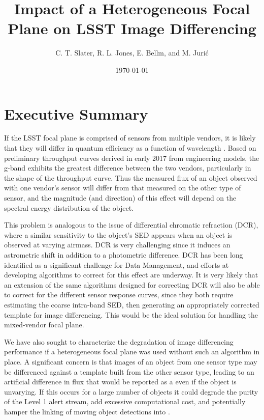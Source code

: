 \documentclass[DM,toc,lsstdraft]{lsstdoc}
\title[Heterogeneous Focal Plane]{Impact of a Heterogeneous Focal Plane on LSST Image Differencing}
\author{C. T. Slater, R. L. Jones, E. Bellm, and M. Juri\'c}
\date{\today}
\begin{document}
\maketitle

\section{Executive Summary}

If the LSST focal plane is comprised of sensors from multiple vendors, it is
likely that they will differ in quantum efficiency as a function of wavelength .
Based on preliminary throughput curves derived in early 2017 from engineering
models, the g-band exhibits the greatest difference between the two vendors,
particularly in the shape of the throughput curve. Thus the measured flux of an
object observed with one vendor's sensor will differ from that measured on the
other type of sensor, and the magnitude (and direction) of this effect will
depend on the spectral energy distribution of the object.

This problem is analogous to the issue of differential chromatic refraction (DCR),
where a similar sensitivity to the object's SED appears when an object is
observed at varying airmass. DCR is very challenging since it induces an
astrometric shift in addition to a photometric difference. DCR has been long
identified as a significant challenge for Data Management, and efforts at
developing algorithms to correct for this effect are underway. It is very likely
that an extension of the same algorithms designed for correcting DCR will also
be able to correct for the different sensor response curves, since they both
require estimating the coarse intra-band SED, then generating an appropriately
corrected template for image differencing. This would be the ideal solution for
handling the mixed-vendor focal plane.

We have also sought to characterize the degradation of image differencing
performance if a heterogeneous focal plane was used without such an algorithm in place.
A significant concern is that images of an object from one sensor type may be
differenced against a template built from the other sensor type, leading to an
artificial difference in flux that would be reported as a \DIASource even if the
object is unvarying. If this occurs for a large number of objects it could
degrade the purity of the Level 1 alert stream, add excessive computational
cost, and potentially hamper the linking of moving object detections into
\SSObjects.
\end{document}
